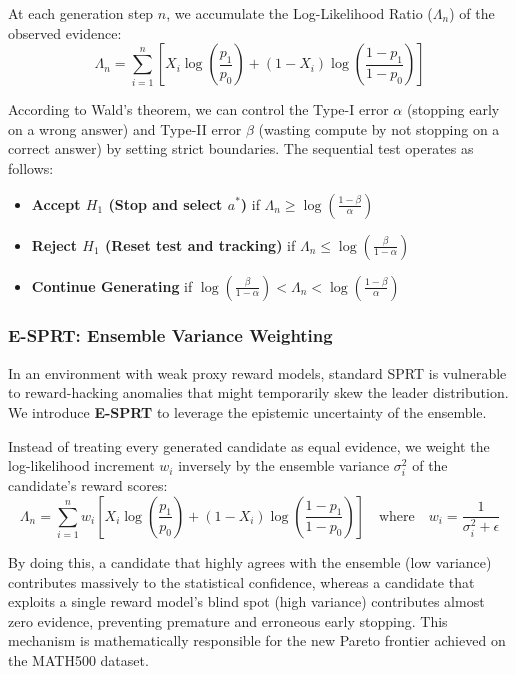 \documentclass[a4paper,11pt]{article}
\begin{document}
At each generation step $n$, we accumulate the Log-Likelihood Ratio ($\Lambda_n$) of the observed evidence:
\begin{equation}
\label{eq:llr}
\Lambda_n = \sum_{i=1}^n \left[ X_i \log \left(\frac{p_1}{p_0}\right) + (1 - X_i) \log \left(\frac{1 - p_1}{1 - p_0}\right) \right]
\end{equation}

According to Wald's theorem, we can control the Type-I error $\alpha$ (stopping early on a wrong answer) and Type-II error $\beta$ (wasting compute by not stopping on a correct answer) by setting strict boundaries. The sequential test operates as follows:
\begin{itemize}
    \item \textbf{Accept $H_1$ (Stop and select $a^*$)} if $\Lambda_n \geq \log \left(\frac{1-\beta}{\alpha}\right)$
    \item \textbf{Reject $H_1$ (Reset test and tracking)} if $\Lambda_n \leq \log \left(\frac{\beta}{1-\alpha}\right)$
    \item \textbf{Continue Generating} if $\log \left(\frac{\beta}{1-\alpha}\right) < \Lambda_n < \log \left(\frac{1-\beta}{\alpha}\right)$
\end{itemize}

\subsubsection{E-SPRT: Ensemble Variance Weighting}
In an environment with weak proxy reward models, standard SPRT is vulnerable to reward-hacking anomalies that might temporarily skew the leader distribution. We introduce \textbf{E-SPRT} to leverage the epistemic uncertainty of the ensemble. 

Instead of treating every generated candidate as equal evidence, we weight the log-likelihood increment $w_i$ inversely by the ensemble variance $\sigma_i^2$ of the candidate's reward scores:
\begin{equation}
\label{eq:e_sprt}
\Lambda_n = \sum_{i=1}^n w_i \left[ X_i \log \left(\frac{p_1}{p_0}\right) + (1 - X_i) \log \left(\frac{1 - p_1}{1 - p_0}\right) \right] \quad \text{where} \quad w_i = \frac{1}{\sigma_i^2 + \epsilon}
\end{equation}

By doing this, a candidate that highly agrees with the ensemble (low variance) contributes massively to the statistical confidence, whereas a candidate that exploits a single reward model's blind spot (high variance) contributes almost zero evidence, preventing premature and erroneous early stopping. This mechanism is mathematically responsible for the new Pareto frontier achieved on the MATH500 dataset.
\end{document}
